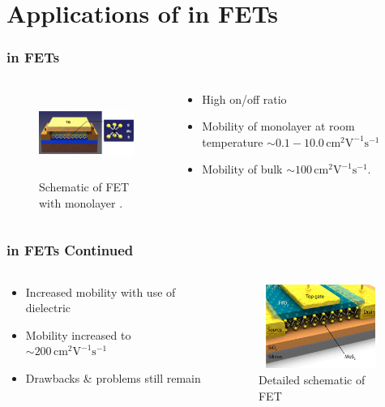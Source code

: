 \documentclass{beamer}
\begin{document}
\section{Applications of  in FETs}
\begin{frame}
\frametitle{ in FETs}
\begin{columns}
	\begin{column}{0.48\textwidth}
		\begin{figure}
			\centering
			\includegraphics[height=2.75cm,width=4.5cm]{../present_figs/mos2FET}
			\caption{Schematic of FET with monolayer .}
		\end{figure}
	\end{column}
	\begin{column}{0.48\textwidth}
		\begin{itemize}
			\item High on/off ratio
			\item Mobility of monolayer  at room temperature $\sim 0.1-10.0\mathrm{\,cm}^2\mathrm{V}^{-1}\mathrm{s}^{-1}$
			\item Mobility of bulk  $\sim 100 \mathrm{\,cm}^{2}\mathrm{V}^{-1}\mathrm{s}^{-1}$.
		\end{itemize}
	\end{column}
\end{columns}
\end{frame}

\begin{frame}
\frametitle{ in FETs Continued}
\begin{columns}
	\begin{column}{0.48\textwidth}
		\begin{itemize}
			\item Increased mobility with use of  dielectric
			\item Mobility increased to $\sim 200 \mathrm{\,cm}^{2}\mathrm{V}^{-1}\mathrm{s}^{-1}$
			\item Drawbacks \& problems still remain
		\end{itemize}
	\end{column}
	\begin{column}{0.48\textwidth}
		\begin{figure}
			\centering
			\includegraphics[height=2.75cm, width=4.5cm]{../present_figs/mos2FET2}
			\caption{Detailed schematic of  FET}
		\end{figure}
	\end{column}
\end{columns}
\end{frame}
\end{document}
